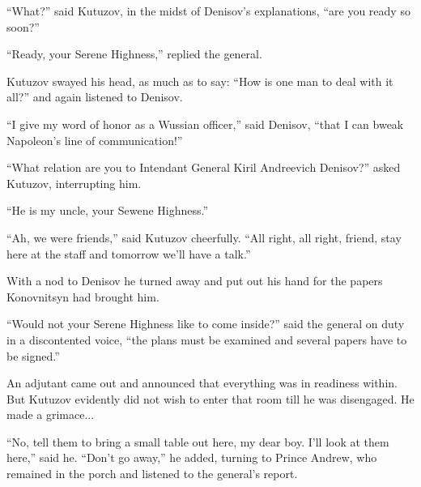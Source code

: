 ``What?'' said Kutuzov, in the midst of Denisov's explanations,
``are you ready so soon?''

``Ready, your Serene Highness,'' replied the general.

Kutuzov swayed his head, as much as to say: ``How is one man to
deal with it all?'' and again listened to Denisov.

``I give my word of honor as a Wussian officer,'' said Denisov,
``that I can bweak Napoleon's line of communication!''

``What relation are you to Intendant General Kiril Andreevich
Denisov?''  asked Kutuzov, interrupting him.

``He is my uncle, your Sewene Highness.''

``Ah, we were friends,'' said Kutuzov cheerfully. ``All right,
all right, friend, stay here at the staff and tomorrow we'll have
a talk.''

With a nod to Denisov he turned away and put out his hand for the
papers Konovnitsyn had brought him.

``Would not your Serene Highness like to come inside?'' said the
general on duty in a discontented voice, ``the plans must be
examined and several papers have to be signed.''

An adjutant came out and announced that everything was in
readiness within. But Kutuzov evidently did not wish to enter
that room till he was disengaged. He made a grimace...

``No, tell them to bring a small table out here, my dear
boy. I'll look at them here,'' said he. ``Don't go away,'' he
added, turning to Prince Andrew, who remained in the porch and
listened to the general's report.

